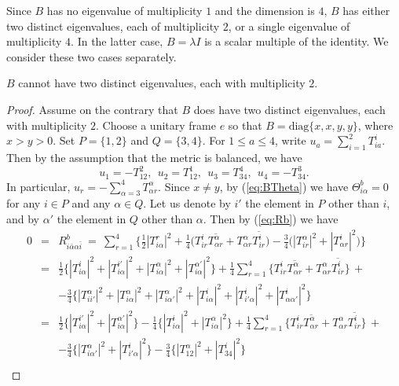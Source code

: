 \documentclass{amsart}
\begin{document}
Since $B$ has no eigenvalue of multiplicity $1$ and the dimension is $4$, $B$ has either two distinct eigenvalues, each of multiplicity $2$, or a single eigenvalue of multiplicity $4$. In the latter case, $B=\lambda I$ is a scalar multiple of the identity. We consider these two cases separately.

\vspace{0.4cm}

 $B$ cannot have two distinct eigenvalues, each with multiplicity $2$.

\begin{proof}
Assume on the contrary that $B$ does have two distinct eigenvalues, each with multiplicity $2$. Choose a unitary frame $e$ so that $B=\mbox{diag}\{ x,x,y,y\}$, where $x>y>0$. Set $P=\{1,2\}$ and $Q=\{3,4\}$. For $1\leq a\leq 4$, write $u_a=\sum_{i=1}^2 T^i_{ia}$. Then by the assumption that the metric is balanced, we have
$$ u_1 = - T^2_{12}, \ \ u_2 = T^1_{12}, \ \ u_3=T^4_{34}, \ \ u_4=-T^3_{34}. $$
In particular, $u_r=-\sum_{\alpha =3}^4 T^{\alpha}_{\alpha r}$. Since $x\neq y$, by (\ref{eq:BTheta}) we have $\Theta^b_{i\alpha}=0$ for any $i\in P$ and any $\alpha \in Q$. Let us denote by $i'$ the element in $P$ other than $i$, and by $\alpha'$ the element in $Q$ other than $\alpha$. Then by (\ref{eq:Rb}) we have
\begin{eqnarray*}
 0 & = &  R^b_{i\bar{\alpha} \alpha \bar{i}} \ = \ \sum_{r=1}^4 \big\{ \frac{1}{2} |T^r_{i\alpha}|^2 + \frac{1}{4} \big( T^i_{ir} \overline{T^{\alpha}_{\alpha r} } + T^{\alpha}_{\alpha r} \overline{T^i_{ir}} \big) -\frac{3}{4} \big( |T^{\alpha}_{ir}|^2 + |T^i_{\alpha r}|^2 \big) \big\} \\
 & = & \frac{1}{2}\big\{ |T^i_{i\alpha}|^2 + |T^{i'}_{i\alpha}|^2 + |T^{\alpha}_{i\alpha}|^2+|T^{\alpha'}_{i\alpha}|^2 \big\} + \frac{1}{4} \sum_{r=1}^4 \big\{ T^i_{ir} \overline{T^{\alpha}_{\alpha r} } + T^{\alpha}_{\alpha r} \overline{T^i_{ir}} \big\} \,+ \\
 & & - \frac{3}{4} \big\{ |T^{\alpha}_{ii'}|^2 + |T^{\alpha}_{i\alpha}|^2 + |T^{\alpha}_{i\alpha'}|^2 + |T^i_{i\alpha }|^2  + |T^i_{i'\alpha }|^2  + |T^i_{\alpha \alpha'}|^2 \big\} \\
 & = & \frac{1}{2}\big\{  |T^{i'}_{i\alpha}|^2 + |T^{\alpha'}_{i\alpha}|^2 \big\} -\frac{1}{4}  \big\{ |T^i_{i\alpha}|^2 +  |T^{\alpha}_{i\alpha}|^2  \big\} + \frac{1}{4} \sum_{r=1}^4 \big\{ T^i_{ir} \overline{T^{\alpha}_{\alpha r} } + T^{\alpha}_{\alpha r} \overline{T^i_{ir}} \big\} \,+ \\
 & & - \frac{3}{4} \big\{  |T^{\alpha}_{i\alpha'}|^2 + |T^i_{i'\alpha }|^2  \big\} - \frac{3}{4} \big\{ |T^{\alpha}_{12}|^2     + |T^i_{34}|^2 \big\} \\

\end{eqnarray*}
\end{proof}
\end{document}
